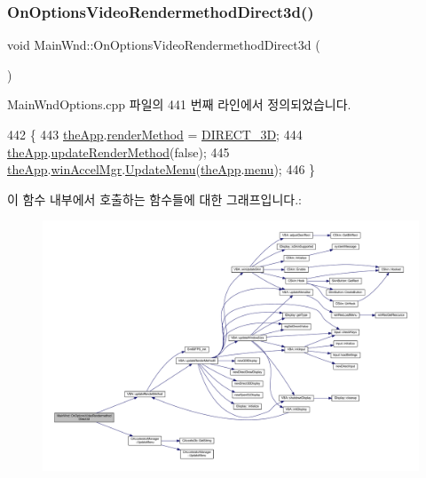 \subsubsection{\texorpdfstring{On\+Options\+Video\+Rendermethod\+Direct3d()}{OnOptionsVideoRendermethodDirect3d()}}
{\footnotesize\ttfamily void Main\+Wnd\+::\+On\+Options\+Video\+Rendermethod\+Direct3d (\begin{DoxyParamCaption}{ }\end{DoxyParamCaption})\hspace{0.3cm}{\ttfamily [protected]}}



Main\+Wnd\+Options.\+cpp 파일의 441 번째 라인에서 정의되었습니다.


\begin{DoxyCode}
442 \{
443   \mbox{\hyperlink{_v_b_a_8cpp_a8095a9d06b37a7efe3723f3218ad8fb3}{theApp}}.\mbox{\hyperlink{class_v_b_a_ae31026d8986a7658f3aaa46fba9de663}{renderMethod}} = \mbox{\hyperlink{_display_8h_aa50f63b0688d0250e0be64d8401d09a0acff887f7ebbcc7cd915719b8b594a56b}{DIRECT\_3D}};
444   \mbox{\hyperlink{_v_b_a_8cpp_a8095a9d06b37a7efe3723f3218ad8fb3}{theApp}}.\mbox{\hyperlink{class_v_b_a_a1d5b9c4597d5c565ce4d8ba1e594a89f}{updateRenderMethod}}(\textcolor{keyword}{false});
445   \mbox{\hyperlink{_v_b_a_8cpp_a8095a9d06b37a7efe3723f3218ad8fb3}{theApp}}.\mbox{\hyperlink{class_v_b_a_ad7ebce057dbde0ca88cee75e84721a89}{winAccelMgr}}.\mbox{\hyperlink{class_c_accelerator_manager_ac7411d20f413ea0ec3bd65705b564adf}{UpdateMenu}}(\mbox{\hyperlink{_v_b_a_8cpp_a8095a9d06b37a7efe3723f3218ad8fb3}{theApp}}.\mbox{\hyperlink{class_v_b_a_acf9d855b5b959a2df9c6cb21b888366e}{menu}});
446 \}
\end{DoxyCode}
이 함수 내부에서 호출하는 함수들에 대한 그래프입니다.\+:
\nopagebreak
\begin{figure}[H]
\begin{center}
\leavevmode
\includegraphics[width=350pt]{class_main_wnd_aa90dfd9dfe90390a030a60e484af0958_cgraph}
\end{center}
\end{figure}
\mbox{\label{class_main_wnd_a09d758ad2d47abea0fbed2f778501958}} 
